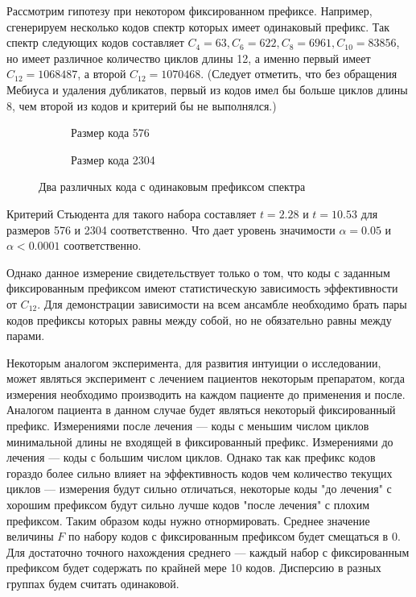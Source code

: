 Рассмотрим гипотезу при некотором фиксированном префиксе. Например, сгенерируем несколько кодов
спектр которых имеет одинаковый префикс. Так спектр следующих кодов составляет 
$C_4=63, C_6=622, C_8=6961, C_{10}=83856$, но имеет различное количество циклов
длины 12, а именно первый имеет $C_{12}=1068487$, а второй $C_{12}=1070468$.  (Следует отметить, что без обращения Мебиуса и удаления дубликатов, первый из кодов имел бы больше
циклов длины 8, чем второй из кодов и критерий бы не выполнялся.)

\begin{figure}[h!]
\centering
\begin{subfigure}{.5\textwidth}
  \centering
  \caption{Размер кода 576}
\end{subfigure}%
\begin{subfigure}{.5\textwidth}
  \centering
  \caption{Размер кода 2304}
\end{subfigure}
\caption{Два различных кода с одинаковым префиксом спектра}
\end{figure}

Критерий Стьюдента для такого набора составляет $t=2.28$ и $t=10.53$ для размеров 576 и 2304 соответственно.
Что дает уровень значимости $\alpha=0.05$ и $\alpha<0.0001$ соответственно.

Однако данное измерение свидетельствует только о том, что коды с заданным фиксированным префиксом
 имеют статистическую зависимость эффективности от $C_{12}$. Для демонстрации зависимости на всем
 ансамбле необходимо брать пары кодов префиксы которых равны между собой, но не обязательно равны
 между парами. 
 
 Некоторым аналогом эксперимента, для развития интуиции о исследовании, может являться эксперимент
 с лечением пациентов некоторым препаратом, когда измерения необходимо производить на каждом пациенте
 до применения и после. Аналогом пациента в данном случае будет являться некоторый фиксированный префикс.
 Измерениями после лечения --- коды с меньшим числом циклов минимальной длины не входящей в фиксированный
 префикс. Измерениями до лечения --- коды с большим числом циклов. Однако так как префикс кодов
 гораздо более сильно влияет на эффективность кодов чем количество текущих циклов --- измерения будут
 сильно отличаться, некоторые коды "до лечения" с хорошим префиксом будут сильно лучше кодов
 "после лечения" с плохим префиксом. Таким образом коды нужно отнормировать. Среднее значение
 величины $F$ по набору кодов с фиксированным префиксом будет смещаться в 0. Для достаточно точного
 нахождения среднего --- каждый набор с фиксированным префиксом будет содержать по крайней мере 10
 кодов. Дисперсию в разных группах будем считать одинаковой.
 
